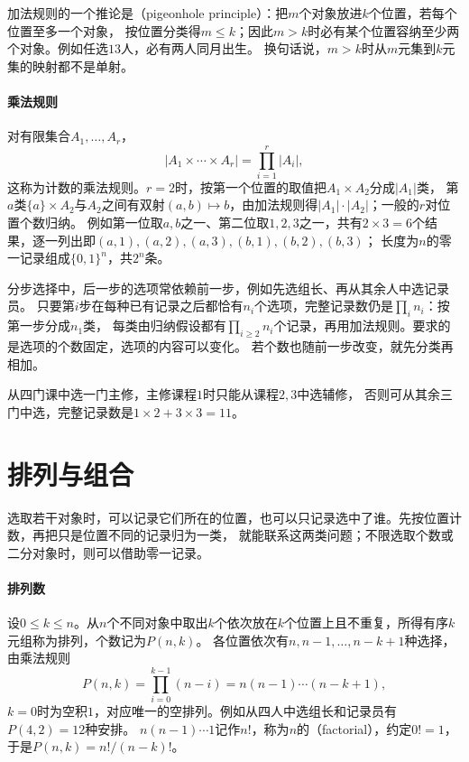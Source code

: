 加法规则的一个推论是（pigeonhole principle）：把$m$个对象放进$k$个位置，若每个位置至多一个对象，
按位置分类得$m\leq k$；因此$m>k$时必有某个位置容纳至少两个对象。例如任选$13$人，必有两人同月出生。
换句话说，$m>k$时从$m$元集到$k$元集的映射都不是单射。

\paragraph{乘法规则}
\label{sec:comb-stepwise-counting}
对有限集合$A_1,\ldots,A_r$，
\[
 |A_1\times\cdots\times A_r|=\prod_{i=1}^r|A_i|,
\]
这称为计数的乘法规则。$r=2$时，按第一个位置的取值把$A_1\times A_2$分成$|A_1|$类，
第$a$类$\{a\}\times A_2$与$A_2$之间有双射$(a,b)\mapsto b$，由加法规则得$|A_1|\cdot|A_2|$；一般的$r$对位置个数归纳。
例如第一位取$a,b$之一、第二位取$1,2,3$之一，共有$2\times3=6$个结果，逐一列出即$(a,1),(a,2),(a,3),(b,1),(b,2),(b,3)$；
长度为$n$的零一记录组成$\{0,1\}^n$，共$2^n$条。

分步选择中，后一步的选项常依赖前一步，例如先选组长、再从其余人中选记录员。
只要第$i$步在每种已有记录之后都恰有$n_i$个选项，完整记录数仍是$\prod_in_i$：按第一步分成$n_1$类，
每类由归纳假设都有$\prod_{i\geq2}n_i$个记录，再用加法规则。要求的是选项的个数固定，选项的内容可以变化。
若个数也随前一步改变，就先分类再相加。
\begin{example}[辅修选项随主修变化]
\label{ex:comb-major-minor}
从四门课中选一门主修，主修课程$1$时只能从课程$2,3$中选辅修，
否则可从其余三门中选，完整记录数是$1\times2+3\times3=11$。
\end{example}

\section{排列与组合}
\label{sec:comb-permutation-combination-counts}
\label{sec:comb-subset-partition-counts}

选取若干对象时，可以记录它们所在的位置，也可以只记录选中了谁。先按位置计数，再把只是位置不同的记录归为一类，
就能联系这两类问题；不限选取个数或二分对象时，则可以借助零一记录。

\paragraph{排列数}
设$0\leq k\leq n$。从$n$个不同对象中取出$k$个依次放在$k$个位置上且不重复，所得有序$k$元组称为排列，个数记为$P(n,k)$。
各位置依次有$n,n-1,\ldots,n-k+1$种选择，由乘法规则
\[
 P(n,k)=\prod_{i=0}^{k-1}(n-i)=n(n-1)\cdots(n-k+1),
\]
$k=0$时为空积$1$，对应唯一的空排列。例如从四人中选组长和记录员有$P(4,2)=12$种安排。
$n(n-1)\cdots1$记作$n!$，称为$n$的（factorial），约定$0!=1$，于是$P(n,k)=n!/(n-k)!$。

